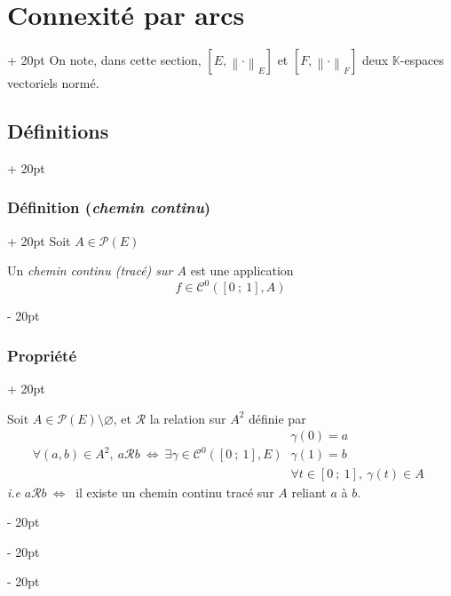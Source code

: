 \documentclass[a4paper, 12pt, twoside]{article}
\newcommand{\K}{\mathbb K}
\newcommand{\seg}[2]{\left[ #1\ ;\ #2 \right]}
\newcommand{\lr}[1]{\left( #1 \right)}
\newcommand{\norm}[1]{\left\lVert #1 \right\rVert}
\newcommand{\ssi}{\ \Leftrightarrow \ }
\newcommand{\ind}[1][20pt]{\advance\leftskip + #1}
\newcommand{\deind}[1][20pt]{\advance\leftskip - #1}
\newenvironment{indt}[2][20pt]{#2 \par \ind[#1]}{\par \deind} %
\begin{document}
    \vspace{12pt}
    
    \begin{indt}{\section{Connexité par arcs}}
        On note, dans cette section, $[E, \norm \cdot _E]$ et $[F, \norm \cdot _F]$ deux $\K$-espaces vectoriels normé.

        \begin{indt}{\subsection{Définitions}}
            \begin{indt}{\subsubsection{Définition (\textit{chemin continu})}}
                Soit $A \in \mathcal P(E)$

                Un \emph{chemin continu (tracé) sur $A$} est une application
                \[
                    f \in \mathcal C^0\!\lr{\seg 0 1, A}
                \]
            \end{indt}

            \vspace{12pt}
            
            \begin{indt}{\subsubsection{Propriété}}
                \label{5.1.2}

                Soit $A \in \mathcal P(E) \setminus \varnothing$, et $\mathcal R$ la relation sur $A^2$ définie par
                \[
                    \forall (a, b) \in A^2,\
                    a \mathcal R b
                    \ssi
                    \exists \gamma \in \mathcal C^0\!\lr{\seg 0 1, E}\
                    \begin{array}{|l}
                        \gamma(0) = a
                        \\
                        \gamma(1) = b
                        \\
                        \forall t \in \seg 0 1,\ \gamma(t) \in A
                    \end{array}
                \]
                \textit{i.e} $a \mathcal R b \ssi$ il existe un chemin continu tracé sur $A$ reliant $a$ à $b$.


\end{indt}
\end{indt}
\end{indt}
\end{document}
